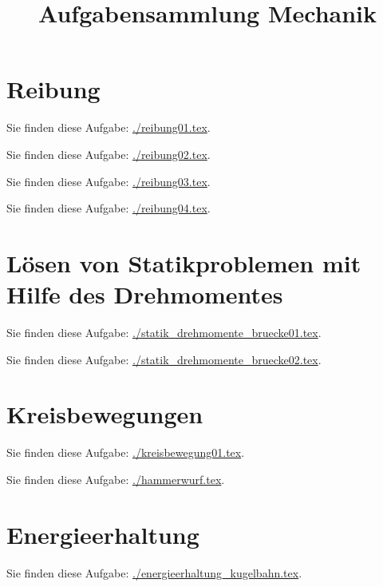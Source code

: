 \documentclass[12pt,a4paper,twoside]{article}
\title{Aufgabensammlung Mechanik}
\date{}
\newcommand{\Einbinden}[1]{\par Sie finden diese Aufgabe: \url{#1}.\par}
\begin{document}
\maketitle

\section{Reibung}
\Einbinden{./reibung01.tex}
\Einbinden{./reibung02.tex}
\Einbinden{./reibung03.tex}
\Einbinden{./reibung04.tex}


\section{Lösen von Statikproblemen mit Hilfe des Drehmomentes}
\Einbinden{./statik_drehmomente_bruecke01.tex}
\newpage
\Einbinden{./statik_drehmomente_bruecke02.tex}






\newpage
\section{Kreisbewegungen}
\Einbinden{./kreisbewegung01.tex}
\newpage
\Einbinden{./hammerwurf.tex}
\newpage

\section{Energieerhaltung}
\Einbinden{./energieerhaltung_kugelbahn.tex}


\newpage
{}
\end{document}
